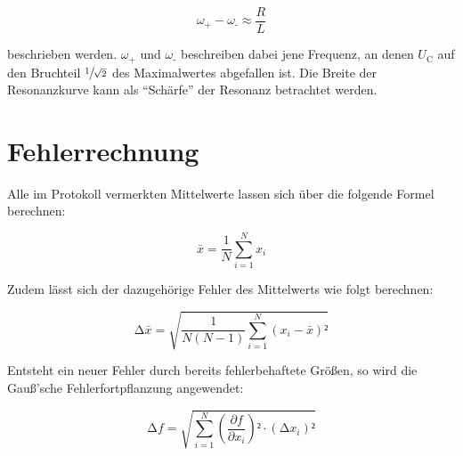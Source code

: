 \begin{equation*}
    \omega_\text{+} - \omega_\text{-} \approx \frac{R}{L}
\end{equation*}

\noindent beschrieben werden. $\omega_\text{+}$ und $\omega_\text{-}$ beschreiben dabei jene Frequenz, an denen $U_\text{C}$ auf den 
Bruchteil $\sfrac{1}{\sqrt{2}}$ des Maximalwertes abgefallen ist. Die Breite der Resonanzkurve kann als \enquote{Schärfe} der 
Resonanz betrachtet werden.


\section{Fehlerrechnung}
\label{sec:Fehlerrechnung}

Alle im Protokoll vermerkten Mittelwerte lassen sich über die folgende Formel berechnen:

\begin{equation}
\label{eqn:Mittelwert}
    \bar{x} = \frac{1}{N}\sum_{i=1}^N x_i
\end{equation}

Zudem lässt sich der dazugehörige Fehler des Mittelwerts wie folgt berechnen:

\begin{equation}
\label{eqn:Mittelwertfehler}
    \increment \bar{x} = \sqrt{\frac{1}{N\left(N-1\right)}\sum_{i=1}^N \left(x_i - \bar{x}\right)²}
\end{equation}

Entsteht ein neuer Fehler durch bereits fehlerbehaftete Größen, so wird die Gauß'sche Fehlerfortpflanzung angewendet:

\begin{equation}
\label{eqn:Fehlerfortpflanzung}
    \increment f = \sqrt{\sum_{i=1}^N \left(\frac{\partial f}{\partial x_i}\right)²\cdot\left(\increment x_i\right)²}
\end{equation}

